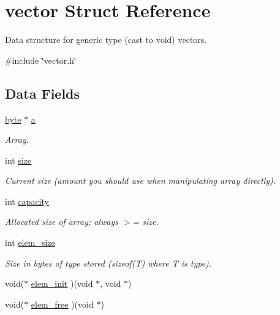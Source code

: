 \hypertarget{structvector}{\section{vector \-Struct \-Reference}
\label{structvector}
}


\-Data structure for generic type (cast to void) vectors.  




{\ttfamily \#include \char`\"{}vector.\-h\char`\"{}}

\subsection*{\-Data \-Fields}
\begin{DoxyCompactItemize}
\item 
\hyperlink{vector_8h_a0c8186d9b9b7880309c27230bbb5e69d}{byte} $\ast$ \hyperlink{structvector_ae086a0bd5a910803add11ed953819018}{a}
\begin{DoxyCompactList}\small\item\em \-Array. \end{DoxyCompactList}\item 
int \hyperlink{structvector_a211c6f9096b87e1ff8b09ad5ad373e61}{size}
\begin{DoxyCompactList}\small\item\em \-Current size (amount you should use when manipulating array directly). \end{DoxyCompactList}\item 
int \hyperlink{structvector_a95bc684a8044cfc0e509861448908bf2}{capacity}
\begin{DoxyCompactList}\small\item\em \-Allocated size of array; always $>$= size. \end{DoxyCompactList}\item 
int \hyperlink{structvector_a1e2d06aaea690d5420fc153fa9b8c2b8}{elem\-\_\-size}
\begin{DoxyCompactList}\small\item\em \-Size in bytes of type stored (sizeof(\-T) where \-T is type). \end{DoxyCompactList}\item 
void($\ast$ \hyperlink{structvector_a9aa1b736be034d1734173299ba7874e2}{elem\-\_\-init} )(void $\ast$, void $\ast$)
\item 
void($\ast$ \hyperlink{structvector_aa707fd886c386fe365b6d6dbadb49733}{elem\-\_\-free} )(void $\ast$)
\end{DoxyCompactItemize}


